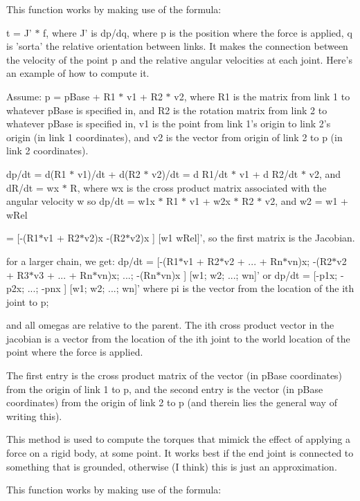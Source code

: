 This function works by making use of the formula:

t = J' $\ast$ f, where J' is dp/dq, where p is the position where the force is applied, q is 'sorta' the relative orientation between links. It makes the connection between the velocity of the point p and the relative angular velocities at each joint. Here's an example of how to compute it.

Assume: p = pBase + R1 $\ast$ v1 + R2 $\ast$ v2, where R1 is the matrix from link 1 to whatever pBase is specified in, and R2 is the rotation matrix from link 2 to whatever pBase is specified in, v1 is the point from link 1's origin to link 2's origin (in link 1 coordinates), and v2 is the vector from origin of link 2 to p (in link 2 coordinates).

dp/dt = d(R1 $\ast$ v1)/dt + d(R2 $\ast$ v2)/dt = d R1/dt $\ast$ v1 + d R2/dt $\ast$ v2, and dR/dt = wx $\ast$ R, where wx is the cross product matrix associated with the angular velocity w so dp/dt = w1x $\ast$ R1 $\ast$ v1 + w2x $\ast$ R2 $\ast$ v2, and w2 = w1 + wRel

= \mbox{[}-\/(R1$\ast$v1 + R2$\ast$v2)x -\/(R2$\ast$v2)x \mbox{]} \mbox{[}w1 wRel\mbox{]}', so the first matrix is the Jacobian.

for a larger chain, we get: dp/dt = \mbox{[}-\/(R1$\ast$v1 + R2$\ast$v2 + ... + Rn$\ast$vn)x; -\/(R2$\ast$v2 + R3$\ast$v3 + ... + Rn$\ast$vn)x; ...; -\/(Rn$\ast$vn)x \mbox{]} \mbox{[}w1; w2; ...; wn\mbox{]}' or dp/dt = \mbox{[}-\/p1x; -\/p2x; ...; -\/pnx \mbox{]} \mbox{[}w1; w2; ...; wn\mbox{]}' where pi is the vector from the location of the ith joint to p;

and all omegas are relative to the parent. The ith cross product vector in the jacobian is a vector from the location of the ith joint to the world location of the point where the force is applied.

The first entry is the cross product matrix of the vector (in pBase coordinates) from the origin of link 1 to p, and the second entry is the vector (in pBase coordinates) from the origin of link 2 to p (and therein lies the general way of writing this).

This method is used to compute the torques that mimick the effect of applying a force on a rigid body, at some point. It works best if the end joint is connected to something that is grounded, otherwise (I think) this is just an approximation.

This function works by making use of the formula:

